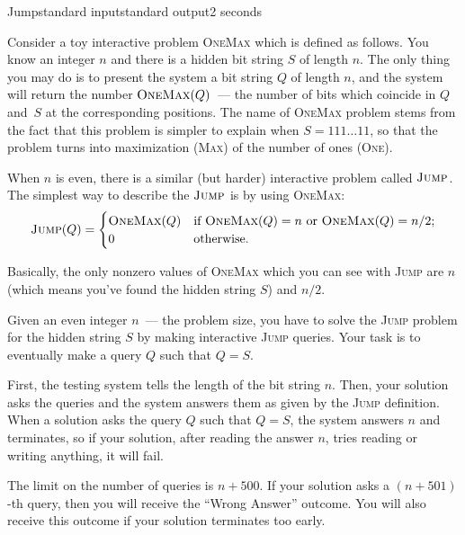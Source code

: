 \begin{problem}{Jump}{standard input}{standard output}{2 seconds}


Consider a toy interactive problem \textsc{OneMax} which is defined as follows. 
You know an integer $n$ and there is a hidden bit string $S$ of length $n$. 
The only thing you may do is to present the system a bit string $Q$ of length $n$, 
and the system will return the number $\textsc{OneMax}(Q)$~--- 
the number of bits which coincide in $Q$ and~$S$ at the corresponding positions.
The name of \textsc{OneMax} problem stems from the fact that this problem is simpler to explain
when $S = 111\ldots11$, so that the problem turns into maximization (\textsc{Max}) of the number of ones (\textsc{One}).

When $n$ is even, there is a similar (but harder) interactive problem called $\textsc{Jump}$. 
The simplest way to describe the $\textsc{Jump}$ is by using \textsc{OneMax}:
\begin{equation*}
\textsc{Jump}(Q) = \begin{cases}
\textsc{OneMax}(Q) & \text{if } \textsc{OneMax}(Q) = n \text{ or } \textsc{OneMax}(Q) = n/2;\\
0 & \text{otherwise}.
\end{cases}
\end{equation*}

Basically, the only nonzero values of \textsc{OneMax} which you can see with \textsc{Jump} 
are $n$ (which means you've found the hidden string $S$) and $n/2$.

Given an even integer $n$~--- the problem size, you have to solve the \textsc{Jump} problem
for the hidden string $S$ by making interactive \textsc{Jump} queries. 
Your task is to eventually make a query $Q$ such that $Q = S$.

\Interaction

First, the testing system tells the length of the bit string $n$. 
Then, your solution asks the queries and the system answers them as given by the \textsc{Jump} definition. 
When a solution asks the query $Q$ such that $Q = S$, the system answers $n$ and terminates,
so if your solution, after reading the answer $n$, tries reading or writing anything, it will fail.

The limit on the number of queries is $n + 500$. If your solution asks a $(n + 501)$-th query,
then you will receive the ``Wrong Answer'' outcome. 
You will also receive this outcome if your solution terminates too early.


\end{problem}
